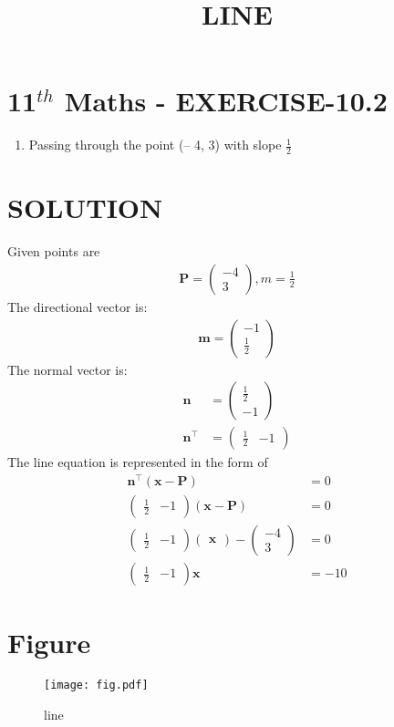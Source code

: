\documentclass[12pt]{article}
\providecommand{\brak}[1]{\ensuremath{\left(#1\right)}}
\newcommand{\myvec}[1]{\ensuremath{\begin{pmatrix}#1\end{pmatrix}}}
\let\vec\mathbf
\begin{document}
\begin{center}
\title{\textbf{LINE}}
\date{\vspace{-5ex}} %
\maketitle
\end{center}

\section{11$^{th}$ Maths - EXERCISE-10.2}
\begin{enumerate}
\item Passing through the point (– 4, 3) with slope $\frac{1}{2}$
\end{enumerate}
\section{SOLUTION}
Given points are 
\begin{align}
\vec{P}=\myvec{-4\\ 3},
m=\frac{1}{2}
\end{align}
The directional vector is:
\begin{align}
\vec{m}=\myvec{-1\\ \frac{1}{2}}
\end{align}
The normal vector is:
\begin{align}
\vec{n}&=\myvec{\frac{1}{2}\\ -1}\\
	\vec{n}^\top&=\myvec{\frac{1}{2}& -1}	
\end{align}
The line equation is represented in the form of 
\begin{align}
\vec{n}^\top \brak{\vec{x}-\vec{P}}&= 0 \\
\myvec{\frac{1}{2}& -1}\brak{\vec{x}-\vec{P}}&=0\\ 
\myvec{\frac{1}{2}& -1}{\myvec{\vec{x}}-\myvec{-4\\3}}&=0\\   
\myvec{\frac{1}{2}& -1}{\vec{x}}&=-10
\end{align}
\section{Figure}
\begin{figure}[h]
\centering
\texttt{[image: fig.pdf]}
\caption{line}
		\label{fig:Figure}
\end{figure}
\end{document}
